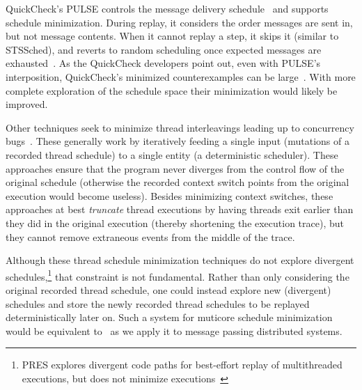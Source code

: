 
QuickCheck's PULSE controls the message delivery
schedule~\cite{claessen2009finding} and supports schedule minimization. During replay, it considers the
order messages are sent in, but not message contents.
When it cannot replay a step, it skips it (similar to
STSSched), and reverts to random scheduling once expected messages
are exhausted~\cite{hughes_email}. As the QuickCheck developers point
out, even with PULSE's interposition, QuickCheck's minimized counterexamples can be
large~\cite{pulse_counterexamples}. With more complete exploration of the
schedule space their minimization would likely be improved.

 Other techniques seek to minimize thread
interleavings leading up to concurrency
bugs~\cite{choi2002isolating,jalbert2010trace,huang2011efficient,el2014efficient}.
These generally work by iteratively feeding a single input (mutations of a
recorded thread schedule) to a single entity (a deterministic scheduler). These approaches
ensure that the program never diverges from the control flow of the
original schedule (otherwise the recorded context switch points from the
original execution would become useless). Besides minimizing context
switches, these approaches at
best {\em truncate} thread executions by having threads exit earlier than they did in the original
execution (thereby shortening the execution trace), but they cannot remove extraneous events from
the middle of the trace.

Although these thread schedule minimization techniques do not
explore divergent schedules,\footnote{PRES
explores divergent code paths for best-effort replay of multithreaded
executions, but does not minimize executions~\cite{park2009pres}}
 that constraint is not fundamental. Rather
than only considering the original recorded thread schedule, one
could instead explore new (divergent) schedules and store the newly recorded
thread schedules to be replayed deterministically later on. Such a system
for muticore schedule minimization would be equivalent to \sys~as we apply it to message passing
distributed systems.

